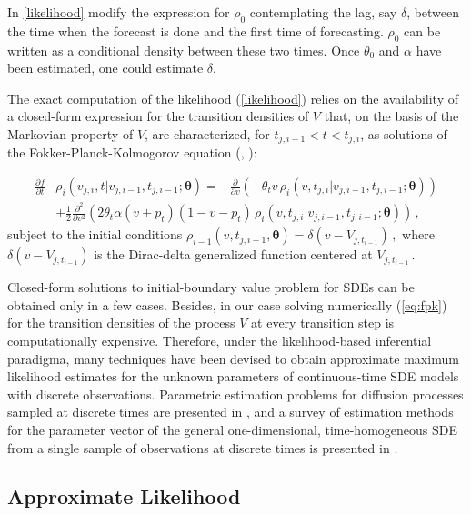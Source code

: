 \documentclass[11pt]{article}
\theoremstyle{definition}
\begin{document}
 {\color{red} In \ref{likelihood} modify the expression for $\rho_0$ contemplating the lag, say $\delta$, between the time when the forecast is done and the first time of forecasting. $\rho_0$ can be written as a conditional density between these two times. Once $\theta_0$ and $\alpha$ have been estimated, one could estimate $\delta$.}

The exact computation of the likelihood (\ref{likelihood}) relies on the availability of a closed-form expression for the transition densities of $V$ that, on the basis of the Markovian property of $V$, are characterized, for $ t_{j, i-1} < t < t_{j,i}$,  as solutions of the Fokker-Planck-Kolmogorov equation (\cite[36]{iacus1}, \cite[61-68]{saso}):

\begin{align}
\frac{ \partial f }{\partial t } & \rho_i(v_{j,i} ,t \vert v_{j,i-1} ,  t_{j,i-1} ; \bm{\theta} )= - \frac{\partial}{ \partial v} (- \theta_t v \, \rho_i(v ,t_{j,i} \vert v_{j,i-1} ,  t_{j,i-1} ; \bm{\theta} ) ) \nonumber \\
& + \frac{1}{2} \frac{\partial^2}{ \partial v^2} ( 2 \theta_t \alpha (v+ p_t) (1 - v- p_t) \, \rho_i(v ,t_{j,i} \vert v_{j,i-1} ,  t_{j,i-1} ; \bm{\theta} ) )\,,  \label{eq:fpk}
\end{align}
subject to the initial conditions $\rho_{i-1}(v , t_{j, i-1} , \bm{\theta} ) = \delta(v - V_{j, t_{i-1}}) \,,$ where $ \delta(v - V_{j, t_{i-1}})$ is the Dirac-delta generalized function centered at $ V_{j, t_{i-1}}\,.$

Closed-form solutions to initial-boundary value problem for SDEs can be obtained only in a few cases. Besides, in our case solving numerically (\ref{eq:fpk}) for the transition densities of the process $V$ at every transition step is computationally expensive. 
Therefore, under the likelihood-based inferential paradigma, many techniques have been devised to obtain approximate maximum likelihood estimates for the unknown parameters of continuous-time SDE models with discrete observations. Parametric estimation problems for diffusion processes sampled at discrete times are presented in \autocite[Chapter 3]{iacus1}, and a survey of estimation methods for the parameter vector of the general one-dimensional, time-homogeneous SDE from a single sample of observations at discrete times is presented in \autocite{hurn}.

\subsection{Approximate Likelihood}
\end{document}
